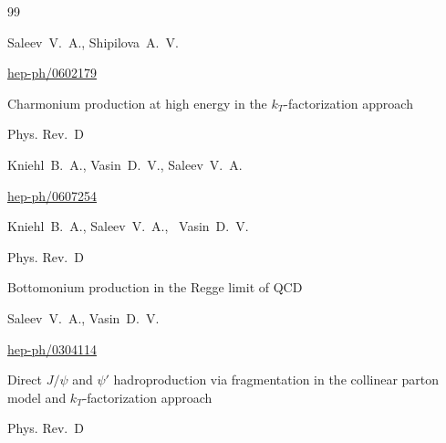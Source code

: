 \begin{thebibliography}{99}


\by Saleev~V.~A., Shipilova~A.~V.





\arxiv \href{http://arxiv.org/abs/hep-ph/0602179}{hep-ph/0602179}

\paper Charmonium production at high energy in the $k_T$-factorization approach


\jour Phys. Rev.~D 



\by Kniehl~B.~A., Vasin~D.~V., Saleev~V.~A.










\arxiv \href{http://arxiv.org/abs/hep-ph/0607254}{hep-ph/0607254}

\by Kniehl~B.~A., Saleev~V.~A., ~Vasin~D.~V.

\jour Phys. Rev.~D 





\paper Bottomonium production in the Regge limit of QCD





\by  Saleev~V.~A.,  Vasin~D.~V.

\arxiv \href{http://arxiv.org/abs/hep-ph/0304114}{hep-ph/0304114}

\paper Direct $J / \psi$ and $\psi'$ hadroproduction via fragmentation in the collinear parton model and $k_T$-factorization approach


\jour Phys. Rev.~D 





\end{thebibliography}
